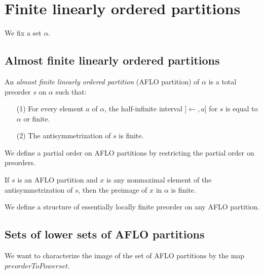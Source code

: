 \section{Finite linearly ordered partitions}

We fix a set $\alpha$.

\subsection{Almost finite linearly ordered partitions}

\begin{subdefi}[AFLOPartitions]
An \emph{almost finite linearly ordered partition} (AFLO partition) of $\alpha$ is a total preorder $s$ on $\alpha$ such that:
\begin{itemize}
\item[(1)] For every element $a$ of $\alpha$, the half-infinite interval $]\leftarrow,a]$ for $s$ is equal to $\alpha$
or finite.

\item[(2)] The antisymmetrization of $s$ is finite.

\end{itemize}
\end{subdefi}

\begin{subdefi}
We define a partial order on AFLO partitions by restricting the partial order on preorders.

\end{subdefi}

\begin{sublemma}
If $s$ is an AFLO partition and $x$ is any nonmaximal element of the antisymmetrization of $s$, then the preimage of
$x$ in $\alpha$ is finite.

\end{sublemma}

\begin{subdefi}
We define a structure of essentially locally finite preorder on any AFLO partition.

\end{subdefi}


\subsection{Sets of lower sets of AFLO partitions}

We want to characterize the image of the set of AFLO partitions by the map $preorderToPowerset$.

